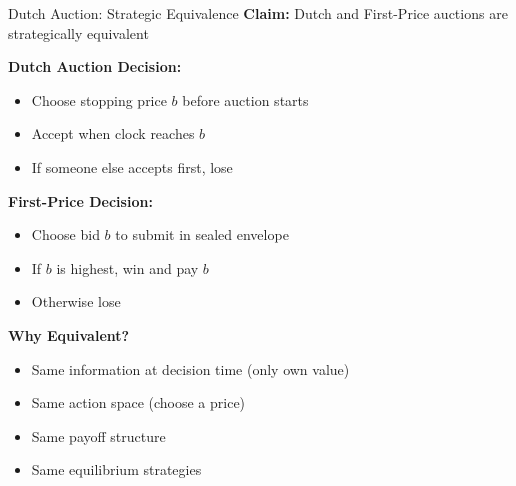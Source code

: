 \documentclass[xcolor={x11names}]{beamer}
\begin{document}
\begin{frame}{Dutch Auction: Strategic Equivalence}
\textbf{Claim:} Dutch and First-Price auctions are strategically equivalent

\textbf{Dutch Auction Decision:}
\begin{itemize}
  \item Choose stopping price $b$ before auction starts
  \item Accept when clock reaches $b$
  \item If someone else accepts first, lose
\end{itemize}

\textbf{First-Price Decision:}
\begin{itemize}
  \item Choose bid $b$ to submit in sealed envelope
  \item If $b$ is highest, win and pay $b$
  \item Otherwise lose
\end{itemize}

\textbf{Why Equivalent?}
\begin{itemize}
  \item Same information at decision time (only own value)
  \item Same action space (choose a price)
  \item Same payoff structure
  \item Same equilibrium strategies
\end{itemize}
\end{frame}
\end{document}

